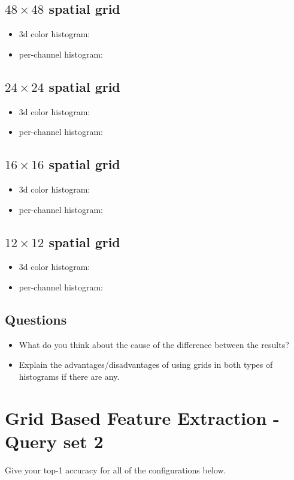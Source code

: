\documentclass[12pt]{article}
\begin{document}
\subsection{$48\times48$ spatial grid}
\begin{itemize}
\item 3d color histogram:
\item per-channel histogram:
\end{itemize}

\subsection{$24\times24$ spatial grid}
\begin{itemize}
\item 3d color histogram:
\item per-channel histogram:
\end{itemize}

\subsection{$16\times16$ spatial grid}
\begin{itemize}
\item 3d color histogram:
\item per-channel histogram:
\end{itemize}

\subsection{$12\times12$ spatial grid}
\begin{itemize}
\item 3d color histogram:
\item per-channel histogram:
\end{itemize}

\subsection{Questions}
\begin{itemize}
\item What do you think about the cause of the difference between the results?
\item Explain the advantages/disadvantages of using grids in both types of histograms if there are any.
\end{itemize}

\section{Grid Based Feature Extraction - Query set 2}
Give your top-1 accuracy for all of the configurations below.
\end{document}
